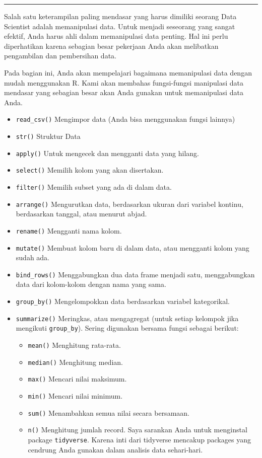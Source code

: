 \documentclass[
]{book}
\providecommand{\tightlist}{%
  \setlength{\itemsep}{0pt}\setlength{\parskip}{0pt}}
\begin{document}
\begin{center}\rule{0.5\linewidth}{0.5pt}\end{center}

Salah satu keterampilan paling mendasar yang harus dimiliki seorang Data Scientist adalah memanipulasi data. Untuk menjadi seseorang yang sangat efektif, Anda harus ahli dalam memanipulasi data penting. Hal ini perlu diperhatikan karena sebagian besar pekerjaan Anda akan melibatkan pengambilan dan pembersihan data.

Pada bagian ini, Anda akan mempelajari bagaimana memanipulasi data dengan mudah menggunakan R. Kami akan membahas fungsi-fungsi manipulasi data mendasar yang sebagian besar akan Anda gunakan untuk memanipulasi data Anda.

\begin{itemize}
\tightlist
\item
  \texttt{read\_csv()} Mengimpor data (Anda bisa menggunakan fungsi lainnya)
\item
  \texttt{str()} Struktur Data
\item
  \texttt{apply()} Untuk mengecek dan mengganti data yang hilang.
\item
  \texttt{select()} Memilih kolom yang akan disertakan.
\item
  \texttt{filter()} Memilih subset yang ada di dalam data.
\item
  \texttt{arrange()} Mengurutkan data, berdasarkan ukuran dari variabel kontinu, berdasarkan tanggal, atau menurut abjad.
\item
  \texttt{rename()} Mengganti nama kolom.
\item
  \texttt{mutate()} Membuat kolom baru di dalam data, atau mengganti kolom yang sudah ada.
\item
  \texttt{bind\_rows()} Menggabungkan dua data frame menjadi satu, menggabungkan data dari kolom-kolom dengan nama yang sama.
\item
  \texttt{group\_by()} Mengelompokkan data berdasarkan variabel kategorikal.
\item
  \texttt{summarize()} Meringkas, atau mengagregat (untuk setiap kelompok jika mengikuti \texttt{group\_by}). Sering digunakan bersama fungsi sebagai berikut:

  \begin{itemize}
  \tightlist
  \item
    \texttt{mean()} Menghitung rata-rata.
  \item
    \texttt{median()} Menghitung median.
  \item
    \texttt{max()} Mencari nilai maksimum.
  \item
    \texttt{min()} Mencari nilai minimum.
  \item
    \texttt{sum()} Menambahkan semua nilai secara bersamaan.
  \item
    \texttt{n()} Menghitung jumlah record.
    Saya sarankan Anda untuk menginstal package \texttt{tidyverse}. Karena inti dari tidyverse mencakup packages yang cendrung Anda gunakan dalam analisis data sehari-hari.
  \end{itemize}
\end{itemize}
\end{document}
